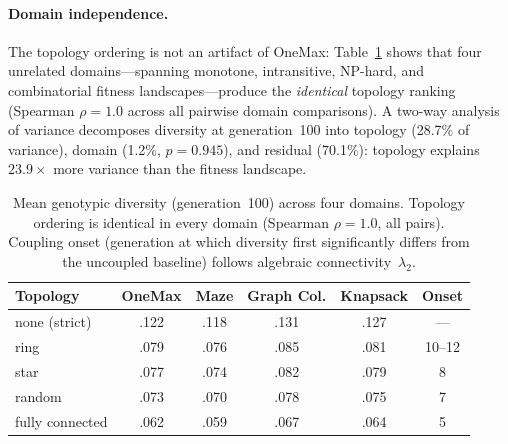 

\paragraph{Domain independence.}
The topology ordering is not an artifact of OneMax: Table~\ref{tab:multi-domain}
shows that four unrelated domains---spanning monotone, intransitive,
NP-hard, and combinatorial fitness landscapes---produce the
\emph{identical} topology ranking (Spearman $\rho = 1.0$ across all
pairwise domain comparisons). A two-way analysis of variance decomposes
diversity at generation~100 into topology (28.7\% of variance), domain
(1.2\%, $p = 0.945$), and residual (70.1\%): topology explains $23.9\times$
more variance than the fitness landscape.

\begin{table}[t]
\centering\small
\caption{Mean genotypic diversity (generation~100) across four domains.
  Topology ordering is identical in every domain
  (Spearman $\rho = 1.0$, all pairs). Coupling onset (generation at
  which diversity first significantly differs from the uncoupled
  baseline) follows algebraic connectivity~$\lambda_2$.}
\label{tab:multi-domain}
\begin{tabular}{@{}l cccc c@{}}
\toprule
Topology & OneMax & Maze & Graph Col. & Knapsack & Onset \\
\midrule
none (strict)   & .122 & .118 & .131 & .127 & --- \\
ring            & .079 & .076 & .085 & .081 & 10--12 \\
star            & .077 & .074 & .082 & .079 & 8 \\
random          & .073 & .070 & .078 & .075 & 7 \\
fully connected & .062 & .059 & .067 & .064 & 5 \\
\bottomrule
\end{tabular}
\end{table}





